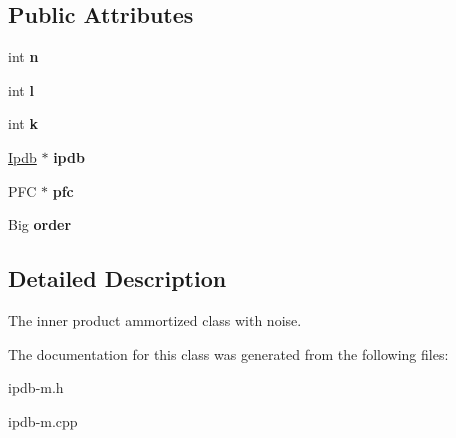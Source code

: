 \subsection*{Public Attributes}
\begin{DoxyCompactItemize}
\item 
int {\bfseries n}\hypertarget{classIpdbNoise_aab9d48df98df74e3f1b5931fd8e80e78}{}\label{classIpdbNoise_aab9d48df98df74e3f1b5931fd8e80e78}

\item 
int {\bfseries l}\hypertarget{classIpdbNoise_a587d074330c19ddebb80d4c33951ffaf}{}\label{classIpdbNoise_a587d074330c19ddebb80d4c33951ffaf}

\item 
int {\bfseries k}\hypertarget{classIpdbNoise_a26c8ce68145dc44b0d96461934a4181e}{}\label{classIpdbNoise_a26c8ce68145dc44b0d96461934a4181e}

\item 
\hyperlink{classIpdb}{Ipdb} $\ast$ {\bfseries ipdb}\hypertarget{classIpdbNoise_a8b68d4edaef45e6819de65e9268fe5a4}{}\label{classIpdbNoise_a8b68d4edaef45e6819de65e9268fe5a4}

\item 
P\+FC $\ast$ {\bfseries pfc}\hypertarget{classIpdbNoise_aae48ffb2a69eacaa0a9e9127e8c67f9c}{}\label{classIpdbNoise_aae48ffb2a69eacaa0a9e9127e8c67f9c}

\item 
Big {\bfseries order}\hypertarget{classIpdbNoise_a5d4ac29dd114058d89de4acacd68462a}{}\label{classIpdbNoise_a5d4ac29dd114058d89de4acacd68462a}

\end{DoxyCompactItemize}


\subsection{Detailed Description}
The inner product ammortized class with noise. 

The documentation for this class was generated from the following files\+:\begin{DoxyCompactItemize}
\item 
ipdb-\/m.\+h\item 
ipdb-\/m.\+cpp\end{DoxyCompactItemize}
